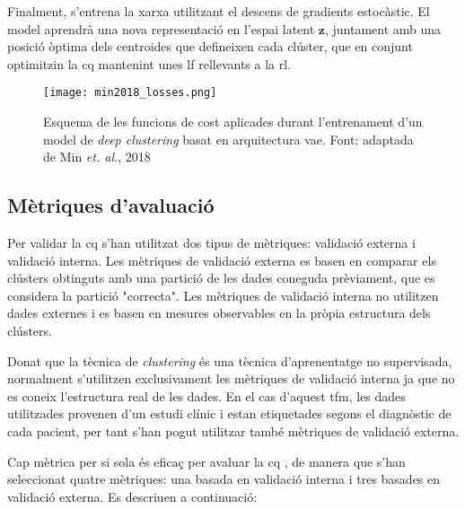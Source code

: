 \documentclass[CAT,BIB]{TFUOC}%
\begin{document}
        Finalment, s'entrena la xarxa utilitzant el descens de gradients estocàstic.
        El model aprendrà una nova representació en l'espai latent $\mathbf{z}$,
        juntament amb una posició òptima dels centroides que defineixen cada clúster,
        que en conjunt optimitzin la \gls{cq}
        mantenint unes \gls{lf} rellevants a la \gls{rl}.

        \begin{figure}
            \centering
            \texttt{[image: min2018\_losses.png]}
            \caption{
                Esquema de les funcions de cost
                aplicades durant l'entrenament
                d'un model de \textit{deep clustering}
                basat en arquitectura \gls{vae}.
                Font: adaptada de Min \textit{et. al.}, 2018 \citep{Min2018}
            }
            \label{fig:vae_losses}
        \end{figure}


    \subsection{Mètriques d'avaluació}
    \label{s:metrics}

        Per validar la \gls{cq}
        s'han utilitzat dos tipus de mètriques:
        validació externa i validació interna.
        Les mètriques de validació externa
        es basen en comparar els clústers obtinguts
        amb una partició de les dades coneguda prèviament,
        que es considera la partició "correcta".
        Les mètriques de validació interna
        no utilitzen dades externes i
        es basen en mesures observables
        en la pròpia estructura dels clústers.

        Donat que la tècnica de \textit{clustering}
        és una tècnica d'aprenentatge no supervisada,
        normalment s'utilitzen exclusivament les mètriques de validació interna
        ja que no es coneix l'estructura real de les dades.
        En el cas d'aquest \gls{tfm},
        les dades utilitzades provenen d'un estudi clínic
        i estan etiquetades segons el diagnòstic de cada pacient,
        per tant s'han pogut utilitzar també mètriques de validació externa.

        Cap mètrica per si sola és eficaç
        per avaluar la \gls{cq} \cite{Palacio-Nino2019},
        de manera que s'han seleccionat quatre mètriques:
        una basada en validació interna
        i tres basades en validació externa.
        Es descriuen a continuació:
\end{document}
